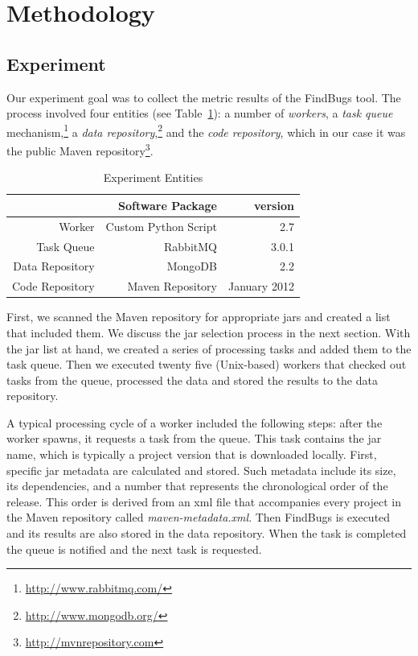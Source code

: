 \documentclass[conference]{IEEEtran}
\begin{document}
\section{Methodology}
\label{sec:meth}


\subsection{Experiment}
\label{sec:exp}

Our experiment goal was to collect the metric results of the FindBugs tool.
The process involved four entities (see Table~\ref{tbl:exp}):
a number of {\it workers}, a {\it task queue}
mechanism,\footnote{\url{http://www.rabbitmq.com/}}
a {\it data repository},\footnote{\url{http://www.mongodb.org/}}
and the {\it code repository}, which in our case it was the public Maven 
repository\footnote{\url{http://mvnrepository.com}}.

\begin{table}
\centering
\caption{Experiment Entities}
\label{tbl:exp}
\begin{tabular}{r r r}
\hline
 & Software Package & version\\
 \hline
Worker & Custom Python Script & 2.7\\
Task Queue & RabbitMQ & 3.0.1 \\
Data Repository & MongoDB & 2.2 \\
Code Repository & Maven Repository & January 2012 \\
\hline
\end{tabular}
\end{table}

First, we scanned the Maven repository for appropriate {\sc jar}s and created a
list that included them. We discuss the {\sc jar} selection process in the next 
section. With the {\sc jar} list at hand, we created a series of processing tasks
and added them to the task queue. Then we executed twenty five (Unix-based)
workers that checked out tasks from the queue, processed the data and stored the
results to the data repository.

A typical processing cycle of a worker included the following steps: after
the worker spawns, it requests a task from the queue. This task contains
the {\sc jar} name, which is typically a project version that is downloaded locally.
First, specific {\sc jar} metadata are calculated and stored. Such metadata include
its size, its dependencies, and a number that represents the chronological order of the
release. This order is derived from an {\sc xml} file that
accompanies every project in the Maven repository called {\it
maven-metadata.xml}. Then FindBugs is executed and its results are also stored
in the data repository. When the task is completed the queue is notified and
the next task is requested.
\end{document}
